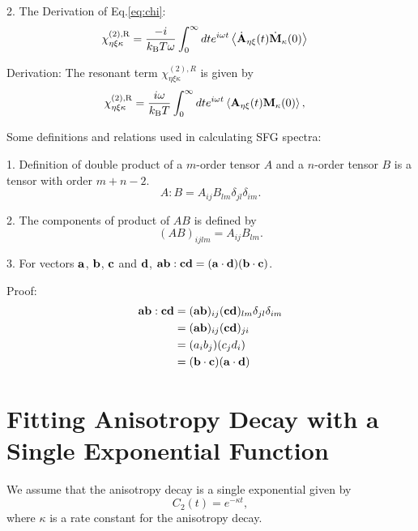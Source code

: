 2. The Derivation of Eq.\space\ref{eq:chi}:
\begin{align}
   \chi^{\text{(2),R}}_{\eta\xi\kappa}&=\frac{-i}{k_{\text{B}}T \omega} \int_0^\infty dt e^{i \omega t}\left\langle \dot{\bf A}_{\eta\xi}(t) \dot{\bf M}_{\kappa}(0)\right\rangle
\end{align}

Derivation: 
The resonant term $\chi^{(2),R}_{\eta\xi\kappa}$ is given by \cite{Morita2008}
\begin{align}
  \chi^{\text{(2),R}}_{\eta\xi\kappa}&=\frac{i\omega}{k_{\text{B}}T} \int_0^\infty dt e^{i \omega t}\left\langle {\bf A}_{\eta\xi}(t) {\bf M}_{\kappa}(0)\right\rangle,
\end{align}


Some definitions and relations used in calculating SFG spectra:

1. Definition of double product of a $m$-order tensor $A$ and a $n$-order tensor $B$ is a tensor with order $m+n-2$.
\begin{equation}
    A:B=A_{ij}B_{lm}\delta_{jl}\delta_{im}.
\label{tensor_double_product}
\end{equation}

2. The components of product of $AB$ is defined by 
\begin{equation}
    (AB)_{ijlm}=A_{ij}B_{lm}.
\label{tensor_product}
\end{equation}

3. For vectors $\bf{a}$, $\bf{b}$, $\bf{c}$ and $\bf{d}$, $\bf{ab}:\bf{cd}=(\bf{a}\cdot\bf{d})(\bf{b}\cdot\bf{c})$.

Proof:
\begin{align}
    {\bf{ab}:\bf{cd}}&=({\bf{ab}})_{ij}({\bf{cd}})_{lm}\delta_{jl}\delta_{im} \nonumber \\
    &=({\bf{ab}})_{ij}({\bf{cd}})_{ji} \nonumber\\
    &=(a_i b_j)(c_j d_i) \nonumber\\
    &=(\bf{b}\cdot\bf{c})(\bf{a}\cdot\bf{d})
\end{align}

\section{Fitting Anisotropy Decay with a Single Exponential Function}\label{single_exp}
We assume that the anisotropy decay is a single exponential given by 
\begin{equation}
C_2(t)=e^{-\kappa t},
\label{eq:tcf2}
\end{equation}
where $\kappa$ is a rate constant for the anisotropy decay.

